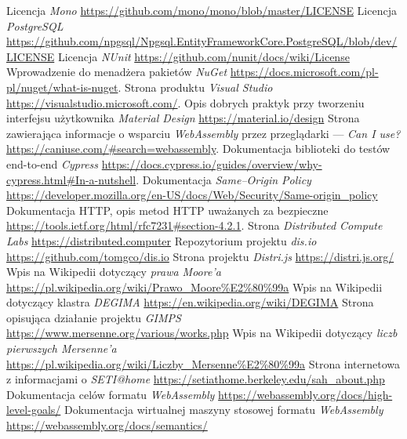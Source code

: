 \documentclass[a4paper,11pt,twoside]{report}
\theoremstyle{definition}
\begin{document}
\begin{thebibliography}{35}
     Licencja \emph{Mono} \url{https://github.com/mono/mono/blob/master/LICENSE}
     Licencja \emph{PostgreSQL} \url{https://github.com/npgsql/Npgsql.EntityFrameworkCore.PostgreSQL/blob/dev/LICENSE}
     Licencja \emph{NUnit} \url{https://github.com/nunit/docs/wiki/License}
     Wprowadzenie do menadżera pakietów \emph{NuGet} \url{https://docs.microsoft.com/pl-pl/nuget/what-is-nuget}.
     Strona produktu \emph{Visual Studio} \url{https://visualstudio.microsoft.com/}.
     Opis dobrych praktyk przy tworzeniu interfejsu użytkownika \emph{Material Design} \url{https://material.io/design}
     Strona zawierająca informacje o wsparciu \textit{WebAssembly} przez przeglądarki --- \emph{Can I use?} \url{https://caniuse.com/#search=webassembly}.
     Dokumentacja biblioteki do testów end-to-end \emph{Cypress} \url{https://docs.cypress.io/guides/overview/why-cypress.html#In-a-nutshell}.
     Dokumentacja \emph{Same--Origin Policy} \url{https://developer.mozilla.org/en-US/docs/Web/Security/Same-origin_policy}
     Dokumentacja HTTP, opis metod HTTP uważanych za bezpieczne \url{https://tools.ietf.org/html/rfc7231#section-4.2.1}.
     Strona \emph{Distributed Compute Labs} \url{https://distributed.computer}
     Repozytorium projektu \emph{dis.io} \url{https://github.com/tomgco/dis.io}
     Strona projektu \emph{Distri.js} \url{https://distri.js.org/}
     Wpis na Wikipedii dotyczący \emph{prawa Moore'a} \url{https://pl.wikipedia.org/wiki/Prawo_Moore%E2%80%99a}
     Wpis na Wikipedii dotyczący klastra \emph{DEGIMA} \url{https://en.wikipedia.org/wiki/DEGIMA}
     Strona opisująca działanie projektu \emph{GIMPS} \url{https://www.mersenne.org/various/works.php}
     Wpis na Wikipedii dotyczący \emph{liczb pierwszych Mersenne'a} \url{https://pl.wikipedia.org/wiki/Liczby_Mersenne%E2%80%99a}
     Strona internetowa z informacjami o \emph{SETI@home} \url{https://setiathome.berkeley.edu/sah_about.php}
     Dokumentacja celów formatu \emph{WebAssembly} \url{https://webassembly.org/docs/high-level-goals/}
     Dokumentacja wirtualnej maszyny stosowej formatu \emph{WebAssembly} \url{https://webassembly.org/docs/semantics/}
\end{thebibliography}
\end{document}
